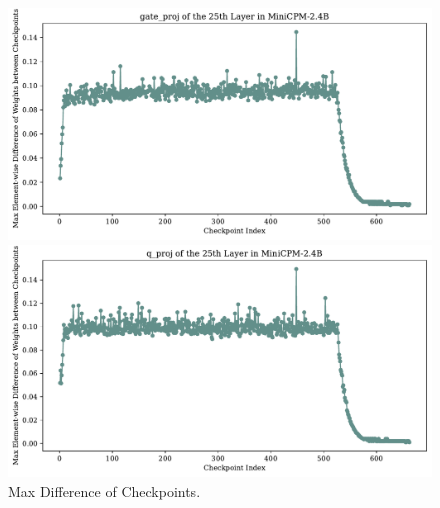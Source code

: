 \begin{figure}[htbp]
    \centering
    \begin{minipage}{0.48\linewidth}
        \centering
        \includegraphics[width=1.0\linewidth]{Fig/gate_proj_projection_vs_rank_25.pdf}
    \end{minipage}
    \hfill %
    \begin{minipage}{0.48\linewidth}
        \centering
        \includegraphics[width=1.0\linewidth]{Fig/q_proj_projection_vs_rank_25.pdf}
    \end{minipage}
     \caption{Max Difference of Checkpoints.}
        \label{fig:appmaxdiff}
\end{figure}



